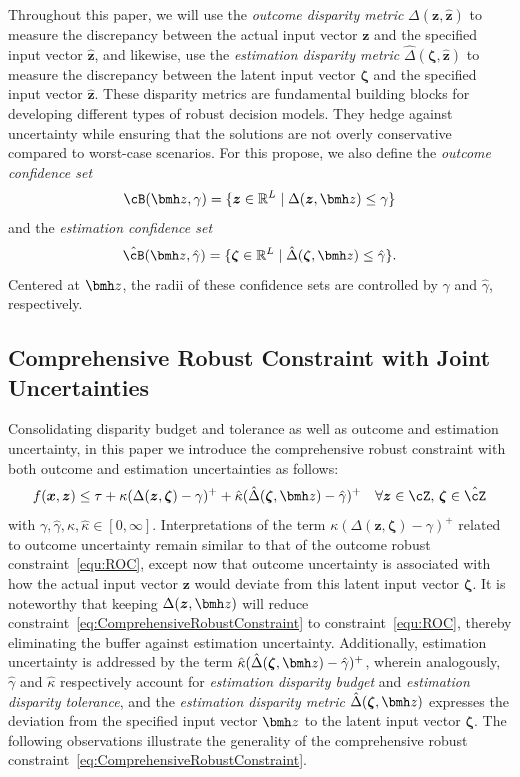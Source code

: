 \documentclass[opre, blindrev]{informs4}
\newcommand{\1}[1]{\mathds{1}{\left(#1\right)}}
\begin{document}
Throughout this paper, we will use the \textit{outcome disparity metric} $\Delta(\bm z, \hat{\bm z})$ to measure the discrepancy between the actual input vector $\bm z$ and the specified input vector $\hat{\bm z}$, and likewise, use the \textit{estimation disparity metric} $\hat \Delta(\bm \zeta, \hat{\bm z})$ to measure the discrepancy between the latent input vector $\bm \zeta$ and the specified input vector $\hat{\bm z}$. These disparity metrics are fundamental building blocks for developing different types of robust decision models. They hedge against uncertainty while ensuring that the solutions are not overly conservative compared to worst-case scenarios. For this propose, we also define the {\em outcome confidence set}
$$
\cB(\bmh z, \gamma) = \{ \bm z \in \mathbb{R}^L \;|\; \Delta(\bm z,\bmh z) \leq \gamma \}
$$
and the {\em estimation confidence set}
$$
\hat \cB(\bmh z, 
\hat \gamma) = \{ \bm \zeta \in \mathbb{R}^L \;|\; \hat \Delta(\bm \zeta,\bmh z) \leq \hat \gamma \}. 
$$
Centered at $\bmh z$, the radii of these confidence sets are controlled by $\gamma$ and $\hat \gamma$, respectively.

\subsection*{Comprehensive Robust Constraint with Joint Uncertainties}

Consolidating disparity budget and tolerance as well as outcome and estimation uncertainty, in this paper we introduce the comprehensive robust constraint with both outcome and estimation uncertainties as follows:
\begin{equation}
\label{eq:ComprehensiveRobustConstraint}
f(\bm x,\bm z) \leq \tau + \kappa (\Delta(\bm z,\bm \zeta) - \gamma)^+ + \hat \kappa (\hat \Delta(\bm \zeta,\bmh z) - \hat \gamma)^+ ~~~\forall \bm z \in \cZ , \, \bm \zeta \in \hat \cZ
\end{equation}
with $\gamma, \hat \gamma, \kappa, \hat \kappa \in [0, \infty]$. Interpretations of the term $\kappa (\Delta(\bm z,\bm \zeta) - \gamma)^+$ related to outcome uncertainty remain similar to that of the outcome robust constraint~\eqref{equ:ROC}, except now that outcome uncertainty is associated with how the actual input vector $\bm z$ would deviate from this latent input vector $\bm{\zeta}$. 
It is noteworthy that keeping $\Delta(\bm z,\bmh z)$ will reduce constraint~\eqref{eq:ComprehensiveRobustConstraint} to constraint~\eqref{equ:ROC}, thereby eliminating the buffer against estimation uncertainty.
Additionally, estimation uncertainty is addressed by the term 
$\hat \kappa (\hat \Delta(\bm \zeta,\bmh z) - \hat \gamma)^+$, wherein analogously, $\hat \gamma$ and $\hat \kappa$ respectively account for \textit{estimation disparity budget} and \textit{estimation disparity  tolerance}, and the \textit{estimation disparity metric} $\hat \Delta(\bm \zeta,\bmh z)$ expresses the deviation from the specified input vector $\bmh z$ to the latent input vector $\bm \zeta$. The following observations illustrate the generality of the comprehensive robust constraint~\eqref{eq:ComprehensiveRobustConstraint}.
\end{document}
